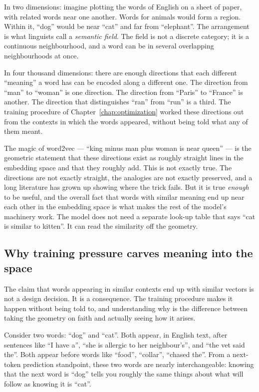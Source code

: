 In two dimensions: imagine plotting the words of English on a
sheet of paper, with related words near one another. Words for
animals would form a region. Within it, ``dog'' would be near
``cat'' and far from ``elephant''. The arrangement is what
linguists call a \emph{semantic field}. The field is not a
discrete category; it is a continuous neighbourhood, and a word
can be in several overlapping neighbourhoods at once.

In four thousand dimensions: there are enough directions that
each different ``meaning'' a word has can be encoded along a
different one. The direction from ``man'' to ``woman'' is one
direction. The direction from ``Paris'' to ``France'' is
another. The direction that distinguishes ``ran'' from ``run''
is a third. The training procedure of Chapter~\ref{chap:optimization} worked these
directions out from the contexts in which the words appeared,
without being told what any of them meant.

The magic of word2vec --- ``king minus man plus woman is near
queen'' --- is the geometric statement that these directions
exist as roughly straight lines in the embedding space and that
they roughly add. This is not exactly true. The directions are
not exactly straight, the analogies are not exactly preserved,
and a long literature has grown up showing where the trick
fails. But it is true \emph{enough} to be useful, and the
overall fact that words with similar meaning end up near each
other in the embedding space is what makes the rest of the
model's machinery work. The model does not need a separate
look-up table that says ``cat is similar to kitten''. It can
read the similarity off the geometry.

\subsection*{Why training pressure carves meaning into the space}

The claim that words appearing in similar contexts end up with
similar vectors is not a design decision. It is a consequence.
The training procedure makes it happen without being told to, and
understanding why is the difference between taking the geometry
on faith and actually seeing how it arises.

Consider two words: ``dog'' and ``cat''. Both appear, in English
text, after sentences like ``I have a'', ``she is allergic to
her neighbour's'', and ``the vet said the''. Both appear before
words like ``food'', ``collar'', ``chased the''. From a next-token
prediction standpoint, these two words are nearly
interchangeable: knowing that the next word is ``dog'' tells you
roughly the same things about what will follow as knowing it is
``cat''.

